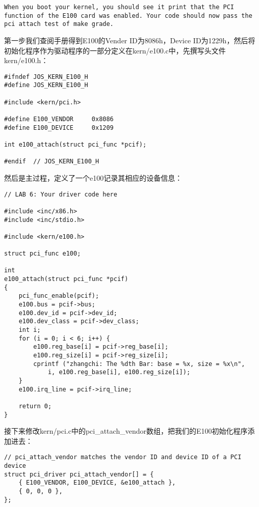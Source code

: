 \documentclass{article}
\begin{document}
\begin{CJK*}{UTF8}{gkai}
\begin{lstlisting}[style=exercise]
When you boot your kernel, you should see it print that the PCI function of the E100 card was enabled. Your code should now pass the pci attach test of make grade.
\end{lstlisting}

第一步我们查阅手册得到E100的Vender ID为8086h，Device ID为1229h，然后将初始化程序作为驱动程序的一部分定义在kern/e100.c中，先撰写头文件kern/e100.h：

\begin{lstlisting}[style=ccode, title={\scriptsize \ttfamily \bfseries kern/e100.h}]
#ifndef JOS_KERN_E100_H
#define JOS_KERN_E100_H

#include <kern/pci.h>

#define E100_VENDOR		0x8086
#define E100_DEVICE		0x1209

int e100_attach(struct pci_func *pcif);

#endif	// JOS_KERN_E100_H
\end{lstlisting}

然后是主过程，定义了一个e100记录其相应的设备信息：

\begin{lstlisting}[style=ccode, title={\scriptsize \ttfamily \bfseries kern/e100.c}]
// LAB 6: Your driver code here

#include <inc/x86.h>
#include <inc/stdio.h>

#include <kern/e100.h>

struct pci_func e100;

int 
e100_attach(struct pci_func *pcif) 
{
    pci_func_enable(pcif);
    e100.bus = pcif->bus;
    e100.dev_id = pcif->dev_id;
    e100.dev_class = pcif->dev_class;
    int i;
    for (i = 0; i < 6; i++) {
    	e100.reg_base[i] = pcif->reg_base[i];
        e100.reg_size[i] = pcif->reg_size[i];
        cprintf ("zhangchi: The %dth Bar: base = %x, size = %x\n", 
            i, e100.reg_base[i], e100.reg_size[i]);
    }
    e100.irq_line = pcif->irq_line;

    return 0;
}
\end{lstlisting}

接下来修改kern/pci.c中的pci\_attach\_vendor数组，把我们的E100初始化程序添加进去：

\begin{lstlisting}[style=ccode, firstnumber=31, title={\scriptsize \ttfamily \bfseries kern/pci.c}]
// pci_attach_vendor matches the vendor ID and device ID of a PCI device
struct pci_driver pci_attach_vendor[] = {
	{ E100_VENDOR, E100_DEVICE, &e100_attach }, 
	{ 0, 0, 0 },
};
\end{lstlisting}


\end{CJK*}
\end{document}

